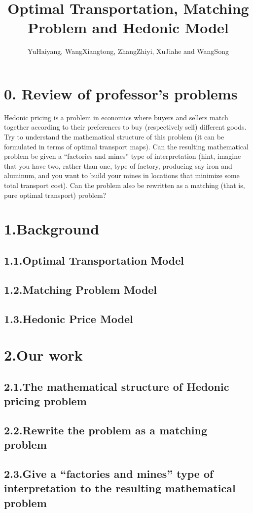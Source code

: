 \documentclass[12pt]{article}
\title{Optimal Transportation, Matching Problem and Hedonic Model}
\author{YuHaiyang, WangXiangtong, ZhangZhiyi, XuJiahe and WangSong}
\date{}
\begin{document}
\maketitle
\section*{0. Review of professor's problems}
Hedonic pricing is a problem in economics where buyers and sellers match together according to
their preferences to buy (respectively sell) different goods. Try to understand the mathematical
structure of this problem (it can be formulated in terms of optimal transport maps). Can the resulting
mathematical problem be given a “factories and mines” type of interpretation (hint, imagine that you
have two, rather than one, type of factory, producing say iron and aluminum, and you want to build
your mines in locations that minimize some total transport cost). Can the problem also be rewritten as
a matching (that is, pure optimal transport) problem?
\section*{1.Background}
\subsection*{1.1.Optimal Transportation Model}
\subsection*{1.2.Matching Problem Model}
\subsection*{1.3.Hedonic Price Model}
\section*{2.Our work}
\subsection*{2.1.The mathematical structure of Hedonic pricing problem}
\subsection*{2.2.Rewrite the problem as a matching problem}
\subsection*{2.3.Give a “factories and mines” type of interpretation to the resulting mathematical problem}
\end{document}
